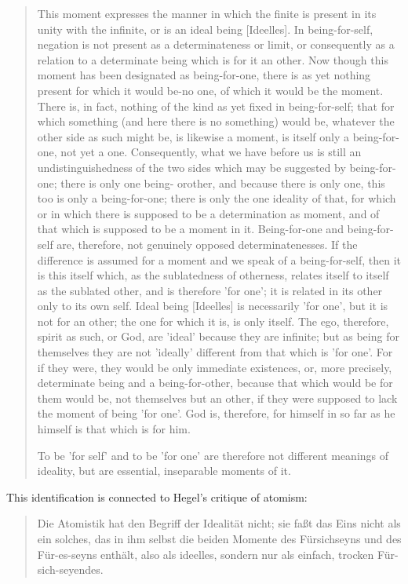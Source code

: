 \documentclass{article}
\begin{document}
\begin{quote}
     This moment expresses the manner in which the finite is present in its unity with the infinite, or
is an ideal being [Ideelles]. In being-for-self, negation is not present as a determinateness or limit,
or consequently as a relation to a determinate being which is for it an other. Now though this moment
has been designated as being-for-one, there is as yet nothing present for which it would be-no one, of
which it would be the moment. There is, in fact, nothing of the kind as yet fixed in being-for-self; that
for which something (and here there is no something) would be, whatever the other side as such might be,
is likewise a moment, is itself only a being-for-one, not yet a one. Consequently, what we have before
us is still an undistinguishedness of the two sides which may be suggested by being-for-one; there is
only one being- orother, and because there is only one, this too is only a being-for-one; there is only
the one ideality of that, for which or in which there is supposed to be a determination as moment, and
of that which is supposed to be a moment in it. Being-for-one and being-for-self are, therefore, not genuinely
opposed determinatenesses. If the difference is assumed for a moment and we speak of a being-for-self,
then it is this itself which, as the sublatedness of otherness, relates itself to itself as the sublated
other, and is therefore 'for one'; it is related in its other only to its own self. Ideal being [Ideelles]
is necessarily 'for one', but it is not for an other; the one for which it is, is only itself. The ego,
therefore, spirit as such, or God, are 'ideal' because they are infinite; but as being for themselves
they are not 'ideally' different from that which is 'for one'. For if they were, they would be only immediate
existences, or, more precisely, determinate being and a being-for-other, because that which would be for
them would be, not themselves but an other, if they were supposed to lack the moment of being 'for one'.
God is, therefore, for himself in so far as he himself is that which is for him.

    To be 'for self' and to be 'for one' are therefore not different
    meanings of ideality, but are essential, inseparable 
    moments of it.
\end{quote}

This identification is connected to Hegel's critique of atomism:

\begin{quote}
     Die Atomistik hat den Begriff der Idealität nicht; sie faßt das Eins nicht als ein solches, das in
ihm selbst die beiden Momente des Fürsichseyns und des Für-es-seyns enthält, also als ideelles, sondern
nur als einfach, trocken Für-sich-seyendes.
\end{quote}
\end{document}
